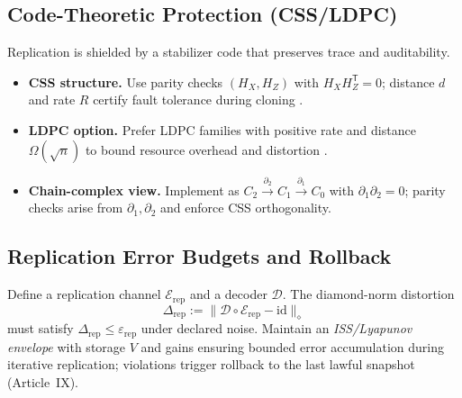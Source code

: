 \documentclass[12pt]{amsart}
\theoremstyle{plain}
\begin{document}
\subsection{Code-Theoretic Protection (CSS/LDPC)}
Replication is shielded by a stabilizer code that preserves trace and auditability.
\begin{itemize}
  \item \textbf{CSS structure.} Use parity checks $(H_X,H_Z)$ with $H_X H_Z^{\mathsf{T}}=0$; distance $d$ and rate $R$ certify fault tolerance during cloning \cite{calderbank1996good,steane1996multiple}.
  \item \textbf{LDPC option.} Prefer LDPC families with positive rate and distance $\Omega(\sqrt{n})$ to bound resource overhead and distortion \cite{tillich2014quantum}.
  \item \textbf{Chain-complex view.} Implement as $C_2\xrightarrow{\partial_2}C_1\xrightarrow{\partial_1}C_0$ with $\partial_1\partial_2=0$; parity checks arise from $\partial_1,\partial_2$ and enforce CSS orthogonality.
\end{itemize}

\subsection{Replication Error Budgets and Rollback}
Define a replication channel $\mathcal{E}_{\mathrm{rep}}$ and a decoder $\mathcal{D}$. The diamond-norm distortion
\[
\Delta_{\mathrm{rep}}:=\|\mathcal{D}\circ \mathcal{E}_{\mathrm{rep}}-\mathrm{id}\|_{\diamond}
\]
must satisfy $\Delta_{\mathrm{rep}}\le \varepsilon_{\mathrm{rep}}$ under declared noise. Maintain an \emph{ISS/Lyapunov envelope} with storage $V$ and gains ensuring bounded error accumulation during iterative replication; violations trigger rollback to the last lawful snapshot (Article~IX).
\end{document}
